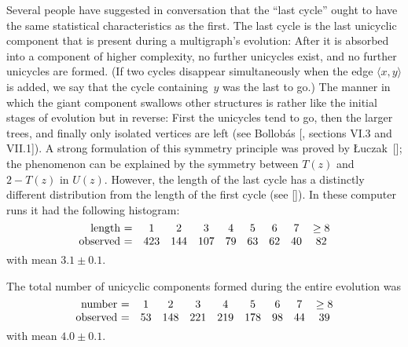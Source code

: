 Several people have suggested in conversation that the ``last cycle''
ought to have the same statistical characteristics as the first. The
last cycle is the last unicyclic component that is present during a multigraph's
evolution: After it is absorbed into a component of higher complexity,
no further unicycles exist, and no further unicycles
are formed. (If two cycles disappear simultaneously
when the edge $\langle x,y\rangle$ is added, we say that the cycle
containing~$y$ was the last to go.) The manner in which the giant component
swallows other structures is rather like the initial stages of evolution
but in reverse: First the unicycles tend to go, then the larger trees,
and finally only isolated vertices are left (see Bollob\'as [\Biii, sections
VI.3 and VII.1]). A strong formulation of this symmetry principle was
proved by \L uczak~[\Li]; the phenomenon can be explained by the symmetry
between $T(z)$ and $2-T(z)$ in $U(z)$. However, the length of the last
cycle has a distinctly different distribution from the length
of the first cycle (see [\JL]). In these computer runs it had
the following histogram:
$$
\vcenter{\halign{\hfil#\ =&&\quad \hfil$#$\hfil\cr
length&1&2&3&4&5&6&7&\ge8\cr
observed&423&144&107&79&63&62&40&82\cr}}$$
with mean $3.1\pm0.1$.

The total number of unicyclic components formed during
the entire evolution was
$$
\vcenter{\halign{\hfil#\ =&&\quad \hfil$#$\hfil\cr
number&1&2&3&4&5&6&7&\ge8\cr
observed&53&148&221&219&178&98&44&39\cr}}$$
with mean $4.0\pm0.1$.

